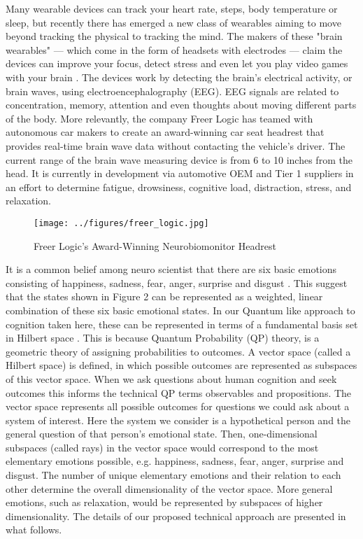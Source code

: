 Many wearable devices can track your heart rate, steps, body temperature or sleep, but recently there has emerged a new class of wearables aiming to move beyond tracking the physical to tracking the mind. The makers of these "brain wearables" — which come in the form of headsets with electrodes — claim the devices can improve your focus, detect stress and even let you play video games with your brain \cite{muse,emotiv}. The devices work by detecting the brain's electrical activity, or brain waves, using electroencephalography (EEG). EEG signals are related to concentration, memory, attention and even thoughts about moving different parts of the body. More relevantly, the company Freer Logic has teamed with autonomous car makers to create an award-winning car seat headrest that provides real-time brain wave data without contacting the vehicle's driver. The current range of the brain wave measuring device is from 6 to 10 inches from the head. It is currently in development via automotive OEM and Tier 1 suppliers in an effort to determine fatigue, drowsiness, cognitive load, distraction, stress, and relaxation.
	\begin{figure}[h]
    \centering
    \texttt{[image: ../figures/freer\_logic.jpg]} 
    \caption{Freer Logic's Award-Winning Neurobiomonitor Headrest}
    \end{figure}
It is a common belief among neuro scientist that there are six basic emotions consisting of happiness, sadness, fear, anger, surprise and disgust \cite{Batty2003,Eimer2003}. This suggest that the states shown in Figure 2 can be represented as a weighted, linear combination of these six basic emotional states. In our Quantum like approach to cognition taken here, these can be represented in terms of a fundamental basis set in Hilbert space \cite{Ashtiani2015}. This is because Quantum Probability (QP) theory, is a geometric theory of assigning probabilities to outcomes. A vector space (called a Hilbert space) is defined, in which possible outcomes are represented as subspaces of this vector space. When we ask questions about human cognition and seek outcomes this informs the technical QP terms observables and propositions. The vector space represents all possible outcomes for questions we could ask about a system of interest. Here the system we consider is a hypothetical person and the general question of that person's emotional state. Then, one-dimensional subspaces (called rays) in the vector space would correspond to the most elementary emotions possible, e.g. happiness, sadness, fear, anger, surprise and disgust. The number of unique elementary emotions and their relation to each other determine the overall dimensionality of the vector space. More general emotions, such as relaxation, would be represented by subspaces of higher dimensionality. The details of our proposed technical approach are presented in what follows.

